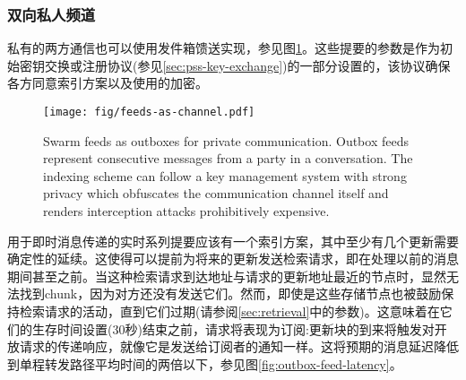 \subsubsection{双向私人频道}
 
私有的两方通信也可以使用发件箱馈送实现，参见图\ref{fig:feeds-as-channel}。这些提要的参数是作为初始密钥交换或注册协议(参见\ref{sec:pss-key-exchange})的一部分设置的，该协议确保各方同意索引方案以及使用的加密。 


\begin{figure}[htbp]
  \centering
  \texttt{[image: fig/feeds-as-channel.pdf]}  
  \caption[Swarm feeds as outboxes \statusgreen]{Swarm feeds as outboxes for private communication. Outbox feeds represent consecutive messages from a party in a conversation. The indexing scheme can follow a key management system with strong privacy which obfuscates the communication channel itself and renders interception attacks prohibitively expensive.}
\label{fig:feeds-as-channel}
\end{figure}


用于即时消息传递的实时系列提要应该有一个索引方案，其中至少有几个更新需要确定性的延续。这使得可以提前为将来的更新发送检索请求，即在处理以前的消息期间甚至之前。当这种检索请求到达地址与请求的更新地址最近的节点时，显然无法找到chunk，因为对方还没有发送它们。然而，即使是这些存储节点也被鼓励保持检索请求的活动，直到它们过期(请参阅\ref{sec:retrieval}中的参数)。这意味着在它们的生存时间设置(30秒)结束之前，请求将表现为订阅:更新块的到来将触发对开放请求的传递响应，就像它是发送给订阅者的通知一样。这将预期的消息延迟降低到单程转发路径平均时间的两倍以下，参见图\ref{fig:outbox-feed-latency}。 


